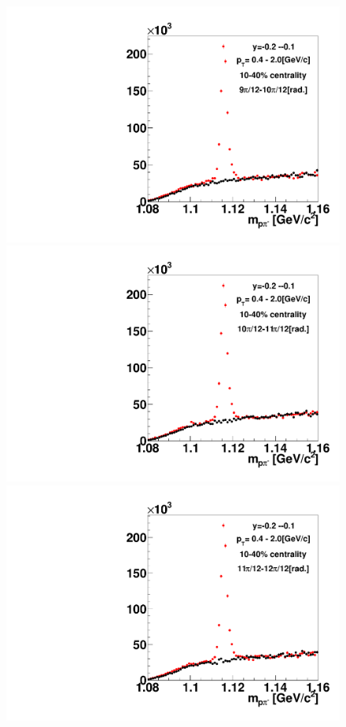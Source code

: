 \begin{figure}[h]
\includegraphics[width=0.14\linewidth]{chapterX/fig/ld_v1_sig/kf_ptslice0_cent1_ld_flow_phi10_rap6_check.pdf}
\includegraphics[width=0.14\linewidth]{chapterX/fig/ld_v1_sig/kf_ptslice0_cent1_ld_flow_phi11_rap6_check.pdf}
\includegraphics[width=0.14\linewidth]{chapterX/fig/ld_v1_sig/kf_ptslice0_cent1_ld_flow_phi12_rap6_check.pdf}


\end{figure}
